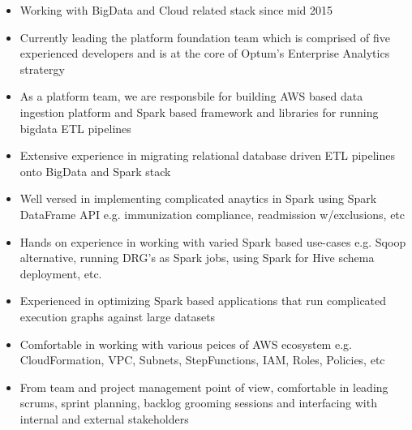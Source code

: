 %
%
%

{
\vspace{1em}
\begin{itemize}
	\item Working with BigData and Cloud related stack since mid 2015
	\item Currently leading the platform foundation team which is comprised of five experienced developers and is at the core of Optum's Enterprise Analytics stratergy
	\item As a platform team, we are responsbile for building AWS based data ingestion platform and Spark based framework and libraries for running bigdata ETL pipelines
	\item Extensive experience in migrating relational database driven ETL pipelines onto BigData and Spark stack
	\item Well versed in implementing complicated anaytics in Spark using Spark DataFrame API e.g. immunization compliance, readmission w/exclusions, etc
	\item Hands on experience in working with varied Spark based use-cases e.g. Sqoop alternative, running DRG's as Spark jobs, using Spark for Hive schema deployment, etc.
	\item Experienced in optimizing Spark based applications that run complicated execution graphs against large datasets
	\item Comfortable in working with various peices of AWS ecosystem e.g. CloudFormation, VPC, Subnets, StepFunctions, IAM, Roles, Policies, etc
	\item From team and project management point of view, comfortable in leading scrums, sprint planning, backlog grooming sessions and interfacing with internal and external stakeholders\\
\end{itemize}
}
